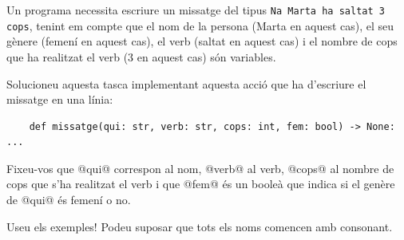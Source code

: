 

\Statement

Un programa necessita escriure un missatge del tipus \texttt{Na Marta ha saltat 3 cops}, tenint em compte que el nom de la persona (Marta en aquest cas), el seu gènere (femení en aquest cas), el verb (saltat en aquest cas) i el nombre de cops que ha realitzat el verb (3 en aquest cas) són variables.

\medskip

Solucioneu aquesta tasca implementant aquesta acció que ha d'escriure el missatge en una línia:

\lstset{language=Python}
\begin{lstlisting}
    def missatge(qui: str, verb: str, cops: int, fem: bool) -> None: ...
\end{lstlisting}

\medskip

Fixeu-vos que @qui@ correspon al nom, @verb@ al verb, @cops@ al nombre de cops que s'ha realitzat el verb i que @fem@ és un booleà que indica si el genère de @qui@ és femení o no. 

\medskip

Useu els exemples! Podeu suposar que tots els noms comencen amb consonant.

\ObservationNoMain
